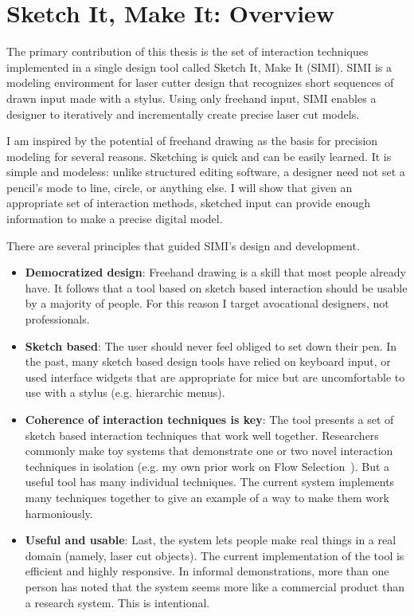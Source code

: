 \chapter{Sketch It, Make It: Overview}

The primary contribution of this thesis is the set of interaction
techniques implemented in a single design tool called Sketch It, Make
It (SIMI). SIMI is a modeling environment for laser cutter design that
recognizes short sequences of drawn input made with a stylus. Using
only freehand input, SIMI enables a designer to iteratively and
incrementally create precise laser cut models.

I am inspired by the potential of freehand drawing as the basis for
precision modeling for several reasons. Sketching is quick and can be
easily learned. It is simple and modeless: unlike structured editing
software, a designer need not set a pencil's mode to line, circle, or
anything else. I will show that given an appropriate set of
interaction methods, sketched input can provide enough information to
make a precise digital model.

There are several principles that guided SIMI's design and development.

\begin{itemize}
\item \textbf{Democratized design}: Freehand drawing is a skill that
  most people already have. It follows that a tool based on sketch
  based interaction should be usable by a majority of people. For this
  reason I target avocational designers, not professionals. 
\item \textbf{Sketch based}: The user should never feel obliged to set
  down their pen. In the past, many sketch based design tools have
  relied on keyboard input, or used interface widgets that are
  appropriate for mice but are uncomfortable to use with a stylus
  (e.g. hierarchic menus).
\item \textbf{Coherence of interaction techniques is key}: The tool
  presents a set of sketch based interaction techniques that work well
  together. Researchers commonly make toy systems that demonstrate one
  or two novel interaction techniques in isolation (e.g. my own prior
  work on Flow Selection~\cite{johnson-flow-selection}). But a useful
  tool has many individual techniques. The current system implements
  many techniques together to give an example of a way to make them
  work harmoniously.
\item \textbf{Useful and usable}: Last, the system lets people make
  real things in a real domain (namely, laser cut objects). The
  current implementation of the tool is efficient and highly
  responsive. In informal demonstrations, more than one person has
  noted that the system seems more like a commercial product than a
  research system. This is intentional.
\end{itemize}


